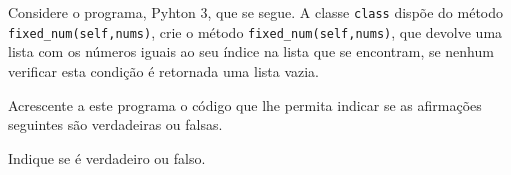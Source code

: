 \documentclass[12pt,varwidth=16cm,border=1pt]{standalone}
\begin{document}
Considere o programa, Pyhton 3, que se segue. A classe \verb+class+ dispõe do método \verb+fixed_num(self,nums)+, crie o método \verb+fixed_num(self,nums)+, que devolve uma lista com os números iguais ao seu índice na lista que se encontram, se nenhum verificar esta condição é retornada uma lista vazia.



Acrescente a este programa o código que lhe permita indicar se as
afirmações seguintes são verdadeiras ou falsas.

Indique se é verdadeiro ou falso.
\end{document}
